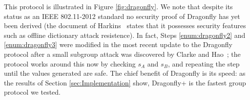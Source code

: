 This protocol is illustrated in Figure \ref{fig:dragonfly}.  We note that despite its status as an IEEE 802.11-2012 standard no security proof of Dragonfly has yet been derived (the document of Harkins~\cite{Ha15} states that it possesses security features such as offline dictionary attack resistence).  In fact, Steps \ref{enum:dragonfly2} and \ref{enum:dragonfly3} were modified in the most recent update to the Dragonfly protocol after a small subgroup attack was discovered by Clarke and Hao~\cite{Ha2014}; the protocol works around this now by checking $s_A$ and $s_B$, and repeating the step until the values generated are safe. The chief benefit of Dragonfly is its speed: as the results of Section \ref{sec:Implementation} show, Dragonfly+ is the fastest group protocol we tested.

\begin{figure}[h]
\end{figure}
